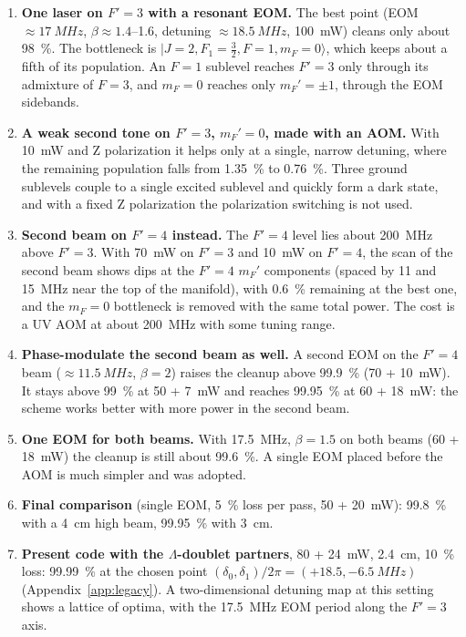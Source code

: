 \documentclass[11pt,a4paper,oneside]{report}
\begin{document}
\begin{enumerate}
  \item \textbf{One laser on $F'=3$ with a resonant EOM.} The best point (EOM
        $\approx\SI{17}{MHz}$, $\beta\approx1.4$--1.6, detuning $\approx\SI{18.5}{MHz}$, \SI{100}{mW})
        cleans only about \SI{98}{\percent}. The bottleneck is
        $|J=2,F_1=\tfrac32,F=1,m_F=0\rangle$, which keeps about a fifth of its population. An
        $F=1$ sublevel reaches $F'=3$ only through its admixture of $F=3$, and $m_F=0$ reaches
        only $m_F'=\pm1$, through the EOM sidebands.
  \item \textbf{A weak second tone on $F'=3$, $m_F'=0$, made with an AOM.} With
        \SI{10}{mW} and Z polarization it helps only at a single, narrow detuning, where the
        remaining population falls from \SI{1.35}{\percent} to \SI{0.76}{\percent}. Three ground
        sublevels couple to a single excited sublevel and quickly form a dark state, and with a
        fixed Z polarization the polarization switching is not used.
  \item \textbf{Second beam on $F'=4$ instead.} The $F'=4$ level lies about \SI{200}{MHz}
        above $F'=3$. With \SI{70}{mW} on $F'=3$ and \SI{10}{mW} on $F'=4$, the scan of the
        second beam shows dips at the $F'=4$ $m_F'$ components (spaced by 11 and \SI{15}{MHz}
        near the top of the manifold), with \SI{0.6}{\percent} remaining at the best one, and
        the $m_F=0$ bottleneck is removed with the same total power. The cost is a UV AOM at about \SI{200}{MHz} with some tuning range.
  \item \textbf{Phase-modulate the second beam as well.} A second EOM on the $F'=4$ beam
        ($\approx\SI{11.5}{MHz}$, $\beta=2$) raises the cleanup above \SI{99.9}{\percent}
        (70 + \SI{10}{mW}). It stays above \SI{99}{\percent} at 50 + \SI{7}{mW} and reaches
        \SI{99.95}{\percent} at 60 + \SI{18}{mW}: the scheme works better with more power in
        the second beam.
  \item \textbf{One EOM for both beams.} With \SI{17.5}{MHz}, $\beta=1.5$ on both beams
        (60 + \SI{18}{mW}) the cleanup is still about \SI{99.6}{\percent}. A single EOM placed
        before the AOM is much simpler and was adopted.
  \item \textbf{Final comparison} (single EOM, \SI{5}{\percent} loss per pass, 50 +
        \SI{20}{mW}): \SI{99.8}{\percent} with a \SI{4}{cm} high beam, \SI{99.95}{\percent}
        with \SI{3}{cm}.
  \item \textbf{Present code with the $\Lambda$-doublet partners}, 80 + \SI{24}{mW},
        \SI{2.4}{cm}, \SI{10}{\percent} loss: \SI{99.99}{\percent} at the chosen point
        $(\delta_0,\delta_1)/2\pi=(+18.5,-\SI{6.5}{MHz})$ (Appendix~\ref{app:legacy}). A
        two-dimensional detuning map at this setting shows a lattice of optima, with the
        \SI{17.5}{MHz} EOM period along the $F'=3$ axis.
\end{enumerate}
\end{document}
